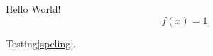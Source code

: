 \documentclass{minimal}
\begin{document}
Hello World!
\begin{equation}
  f(x) = 1
  \label{speling}
\end{equation}

Testing\xspace\cref{speling}.


\end{document}
